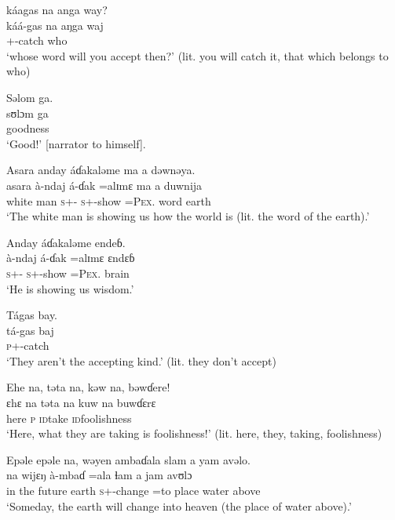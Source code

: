  \medskip
  káagas  na  anga  way?\\
 \gll káá-gas            na      aŋga     waj\\
 {\twoS}+{\POT}-catch    {\PSP}   {\POSS}  who\\
 \glt ‘whose word will you accept then?’ (lit. you will catch it, that which belongs to who)
 \z
 
\clearpage
 \ea Səlom  ga.  \\
 \gll sʊlɔm  ga \\
 goodness  {\ADJ}\\
 \glt ‘Good!’ [narrator to himself].
 \z

\ea Asara  anday  áɗakaləme  ma  a  dəwnəya.\\
 \gll asara   à-ndaj        á-ɗak    =alɪmɛ               ma     a   duwnija\\
 {white man}     \textsc{s}+{\PFV}-{\PROG}  \textsc{s}+{\IFV}-show  =\textsc{Pex}.{\IO}    word   {\GEN}    earth    \\
 \glt ‘The white man is showing us how the world is (lit. the word of the earth).’ 
 \z

\ea Anday  áɗakaləme  endeɓ.  \\
 \gll à-ndaj           á-ɗak    =alɪmɛ     ɛndɛɓ \\
 \textsc{s}+{\PFV}-{\PROG}    \textsc{s}+{\IFV}-show  =\textsc{Pex}.{\IO}  brain  \\
 \glt ‘He is showing us wisdom.’ 
 \z

\ea  Tágas  bay.\\
 \gll tá-gas     baj\\ 
 \textsc{p}+{\IFV}-catch  {\NEG}\\
 \glt ‘They aren’t the accepting kind.’ (lit. they don’t accept) 
 \z

\ea Ehe  na,  təta  na,  kəw  na,  bəwɗere!\\
 \gll ɛhɛ    na      təta   na       kuw      na  buwɗɛrɛ\\
 here   {\PSP}    \textsc{p}    {\PSP}    \textsc{id}take   {\PSP}  \textsc{id}foolishness\\
 \glt ‘Here, what they are taking is foolishness!’ (lit. here, they, taking, foolishness)
 \z

\ea Epəle epəle  na,  wəyen  ambaɗala  slam  a  yam  avəlo.\\
    na   wijɛŋ   à-mbaɗ  =ala   ɬam   a   jam   avʊlɔ\\ 
 {in the future}  {\PSP}  earth  \textsc{s}+{\PFV}-change  =to    place  {\GEN}  water  above\\
 \glt ‘Someday, the earth will change into heaven (the place of water above).’ 
 \z

